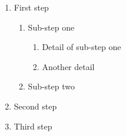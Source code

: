 \begin{enumerate}
    \item First step
    \begin{enumerate}
        \item Sub-step one
        \begin{enumerate}
            \item Detail of sub-step one
            \item Another detail
        \end{enumerate}
        \item Sub-step two
    \end{enumerate}
    \item Second step
    \item Third step
\end{enumerate}
